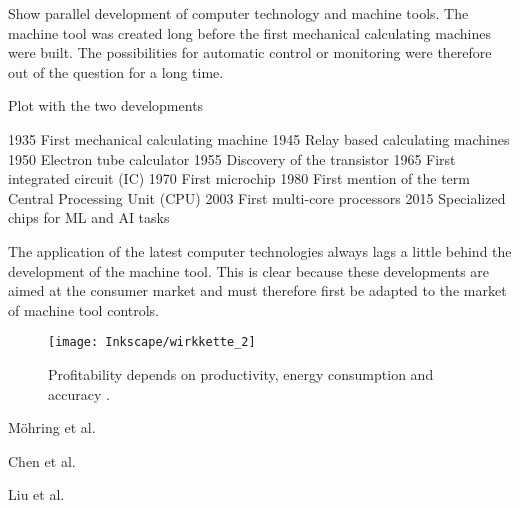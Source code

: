 Show parallel development of computer technology and machine tools. The machine tool was created long before the first mechanical calculating machines were built. The possibilities for automatic control or monitoring were therefore out of the question for a long time. 

Plot with the two developments

1935 First mechanical calculating machine
1945 Relay based calculating machines
1950 Electron tube calculator
1955 Discovery of the transistor
1965 First integrated circuit (IC)
1970 First microchip
1980 First mention of the term Central Processing Unit (CPU)
2003 First multi-core processors
2015 Specialized chips for ML and AI tasks

The application of the latest computer technologies always lags a little behind the development of the machine tool. This is clear because these developments are aimed at the consumer market and must therefore first be adapted to the market of machine tool controls. 


\begin{figure}[!htb]
    \centering
    \texttt{[image: Inkscape/wirkkette\_2]} %
    \caption[Economic and technical relationships]{Profitability depends on productivity, energy consumption and accuracy \cite{Weber2015}.}
    \label{fig:prf_accuracy}
\end{figure}
 
Möhring et al. \cite{Moehring2020}

Chen et al. \cite{Chen2019}

Liu et al. \cite{Liu2018}
